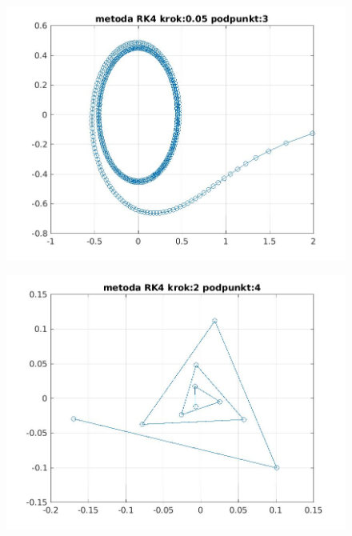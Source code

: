 \documentclass[a4paper, 12pt]{article}
\begin{document}
\begin{figure}[H]
\centering
\includegraphics[width = 15cm]{2d/metoda RK4 krok:0,05 podpunkt:3.jpg}
\end{figure}

\begin{figure}[H]
\centering
\includegraphics[width = 15cm]{2d/metoda RK4 krok:2 podpunkt:4.jpg}
\end{figure}
\end{document}
